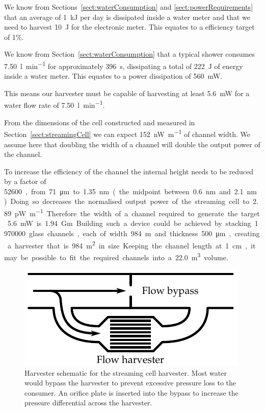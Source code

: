 \documentclass[10pt,final,journal]{IEEEtran}
\begin{document}
    We know from Sections~\ref{sect:waterConsumption} and \ref{sect:powerRequirements} that an average of \SI{1}{\kilo\joule} per day is dissipated inside a water meter and that we need to harvest \SI{10}{\joule} for the electronic meter.
    This equates to a efficiency target of 1\%.

    We know from Section~\ref{sect:waterConsumption} that a typical shower consumes \SI{7.50}{\litre\per\minute} for approximately \SI{396}{\second}, dissipating a total of \SI{222}{\joule} of energy inside a water meter.
    This equates to a power dissipation of \SI{560}{\milli\watt}.

    This means our harvester must be capable of harvesting at least \SI{5.6}{\milli\watt} for a water flow rate of \SI{7.50}{\litre\per\minute}.

    From the dimensions of the cell constructed and measured in Section~\ref{sect:streamingCell} we can expect \SI{152}{\nano\watt\per\metre} of channel width.
    We assume here that doubling the width of a channel will double the output power of the channel.

    To increase the efficiency of the channel the internal height needs to be reduced by a factor of \SI{52600}, from \SI{71}{\micro\metre} to \SI{1.35}{\nano\metre} (the midpoint between \SI{0.6}{\nano\metre} and \SI{2.1}{\nano\metre}).
    Doing so decreases the normalised output power of the streaming cell to \SI{2.89}{\pico\watt\per\metre}.
    Therefore the width of a channel required to generate the target \SI{5.6}{\milli\watt} is \SI{1.94}{\giga\metre}.

    Building such a device could be achieved by stacking \SI{1970000} glass channels, each of width \SI{984}{\metre} and thickness \SI{500}{\micro\metre}, creating a harvester that is \SI{984}{\square\metre} in size.
    Keeping the channel length at \SI{1}{\centi\meter}, it may be possible to fit the required channels into a \SI{22.0}{\cubic\meter} volume.

    \begin{figure}
        \begin{center}
        \includegraphics[]{harvester}
        \end{center}
        \caption{Harvester schematic for the streaming cell harvester.
        Most water would bypass the harvester to prevent excessive pressure loss to the consumer.
        An orifice plate is inserted into the bypass to increase the pressure differential across the harvester.}
        \label{fig:harvester}
    \end{figure}
\end{document}
